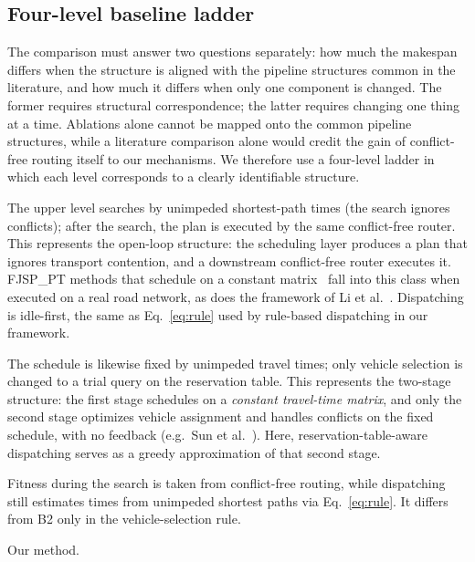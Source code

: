 \documentclass[manuscript,screen,review]{acmart}
\begin{document}
\subsection{Four-level baseline ladder}
\label{sec:arms}

The comparison must answer two questions separately: how much the makespan differs when the structure is aligned with the pipeline structures common in the literature, and how much it differs when only one component is changed.
The former requires structural correspondence; the latter requires changing one thing at a time.
Ablations alone cannot be mapped onto the common pipeline structures, while a literature comparison alone would credit the gain of conflict-free routing itself to our mechanisms.
We therefore use a four-level ladder in which each level corresponds to a clearly identifiable structure.

\begin{description}[leftmargin=0pt,topsep=3pt,itemsep=3pt]
\item[B0: open-loop planning + realized execution.]
The upper level searches by unimpeded shortest-path times (the search ignores conflicts); after the search, the plan is executed by the same conflict-free router.
This represents the open-loop structure: the scheduling layer produces a plan that ignores transport contention, and a downstream conflict-free router executes it. FJSP\_PT methods that schedule on a constant matrix~\cite{meng2025cp,qin2026knowledge,jafarian2026integrated} fall into this class when executed on a real road network, as does the framework of Li et al.~\cite{li2026framework}. Dispatching is idle-first, the same as Eq.~\eqref{eq:rule} used by rule-based dispatching in our framework.
\item[B0+: open-loop planning + reservation-table-aware dispatching.]
The schedule is likewise fixed by unimpeded travel times; only vehicle selection is changed to a trial query on the reservation table.
This represents the two-stage structure: the first stage schedules on a \emph{constant travel-time matrix}, and only the second stage optimizes vehicle assignment and handles conflicts on the fixed schedule, with no feedback (e.g.\ Sun et al.~\cite{sun2023integrated}).
Here, reservation-table-aware dispatching serves as a greedy approximation of that second stage.
\item[B1: closed-loop planning + rule-based dispatching.]
Fitness during the search is taken from conflict-free routing, while dispatching still estimates times from unimpeded shortest paths via Eq.~\eqref{eq:rule}. It differs from B2 only in the vehicle-selection rule.
\item[B2: closed-loop planning + reservation-table-aware dispatching.]
Our method.
\end{description}
\end{document}
